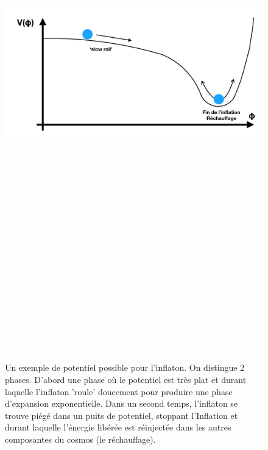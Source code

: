 \begin{figure}[htbp]
	\centering
		\includegraphics[height=25cm]{figs/slowroll.png}
	\caption[Un exemple de potentiel possible pour l'inflaton. ]{Un exemple de potentiel possible pour l'inflaton. On distingue 2 phases. D'abord une phase où le potentiel est très plat et durant laquelle l'inflaton 'roule' doucement pour produire une phase d'expansion exponentielle. Dans un second temps, l'inflaton se trouve piégé dans un puits de potentiel, stoppant l'Inflation et durant laquelle l'énergie libérée est réinjectée dans les autres composantes du cosmos (le réchauffage).}
	\label{f:slowroll}
\end{figure}

